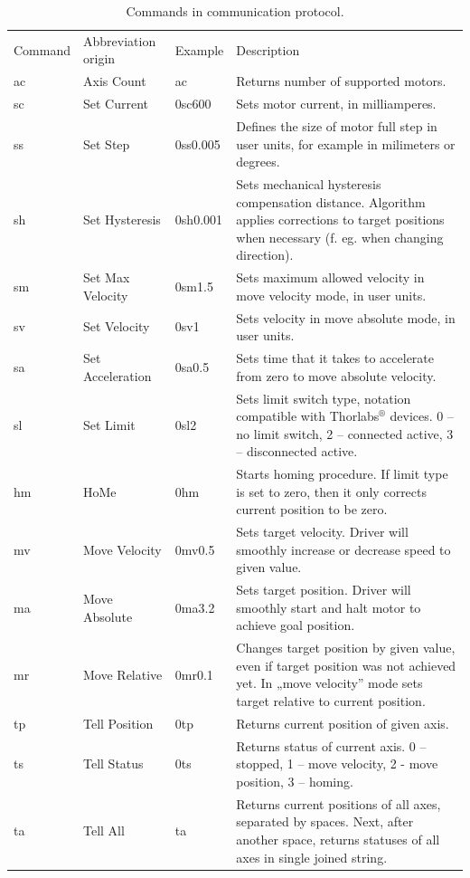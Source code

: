 \documentclass[10pt,article]{article}
\begin{document}
\begin{table}[ht] \centering
\begin{tabularx}{\textwidth}{lllX}
\rowcolor[gray]{0.80} Command & Abbreviation origin & Example & Description\\
\rowcolor[gray]{0.95} ac & Axis Count & ac & Returns number of supported motors.\\
\rowcolor[gray]{0.90} sc & Set Current & 0sc600 & Sets motor current, in milliamperes. \\
\rowcolor[gray]{0.95} ss & Set Step & 0ss0.005 & Defines the size of motor full step in user units, for example in milimeters or degrees. \\
\rowcolor[gray]{0.90} sh & Set Hysteresis & 0sh0.001 & Sets mechanical hysteresis compensation distance. Algorithm applies corrections to target positions when necessary (f. eg. when changing direction). \\
\rowcolor[gray]{0.95} sm & Set Max Velocity & 0sm1.5 & Sets maximum allowed velocity in move velocity mode, in user units. \\
\rowcolor[gray]{0.90} sv & Set Velocity & 0sv1 & Sets velocity in move absolute mode, in user units. \\
\rowcolor[gray]{0.95} sa & Set Acceleration & 0sa0.5 & Sets time that it takes to accelerate from zero to move absolute velocity. \\
\rowcolor[gray]{0.90} sl & Set Limit & 0sl2 & Sets limit switch type, notation compatible with Thorlabs$^®$ devices. 0 – no limit switch, 2 – connected active, 3 – disconnected active. \\
\rowcolor[gray]{0.95} hm & HoMe & 0hm & Starts homing procedure. If limit type is set to zero, then it only corrects current position to be zero. \\
\rowcolor[gray]{0.90} mv & Move Velocity & 0mv0.5 & Sets target velocity. Driver will smoothly increase or decrease speed to given value. \\
\rowcolor[gray]{0.95} ma & Move Absolute & 0ma3.2 & Sets target position. Driver will smoothly start and halt motor to achieve goal position. \\
\rowcolor[gray]{0.90} mr & Move Relative & 0mr0.1 & Changes target position by given value, even if target position was not achieved yet. In „move velocity” mode sets target relative to current position. \\
\rowcolor[gray]{0.95} tp & Tell Position & 0tp & Returns current position of given axis. \\
\rowcolor[gray]{0.90} ts & Tell Status & 0ts & Returns status of current axis. 0 – stopped, 1 – move velocity, 2 - move position, 3 – homing. \\
\rowcolor[gray]{0.95} ta & Tell All & ta & Returns current positions of all axes, separated by spaces. Next, after another space, returns statuses of all axes in single joined string. \\
\end{tabularx}
\caption{Commands in communication protocol.}\label{commands}
\end{table}
\end{document}
